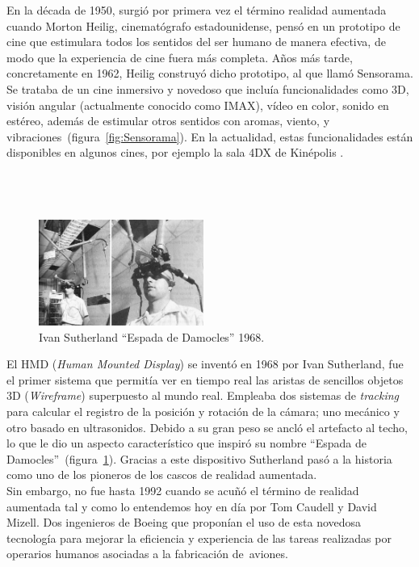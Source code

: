 En la década de 1950, surgió por primera vez el término realidad aumentada cuando Morton Heilig, cinematógrafo estadounidense, pensó en un prototipo de cine que estimulara todos los sentidos del ser humano de manera efectiva, de modo que la experiencia de cine fuera más completa. Años más tarde, concretamente en 1962, Heilig construyó dicho prototipo, al que llamó Sensorama. Se trataba de un cine inmersivo y novedoso que incluía funcionalidades como 3D, visión angular (actualmente conocido como IMAX), vídeo en color, sonido en estéreo, además de estimular otros sentidos con aromas, viento, y vibraciones~(figura~\ref{fig:Sensorama}). En la actualidad, estas funcionalidades están disponibles en algunos cines, por ejemplo la sala 4DX de Kinépolis \cite{kinepolis}.\\
\\
\\
\\


\begin{figure}
    \centering
    \includegraphics[width=0.48\textwidth]{Images/HumanMountDisplay.png}
    \caption{Ivan Sutherland ``Espada de Damocles'' 1968.}
    \label{fig:EspadaDamocles}
\end{figure}

 El HMD (\textit{Human Mounted Display}) se inventó en 1968 por Ivan Sutherland, fue el primer sistema que permitía ver en tiempo real las aristas de sencillos objetos 3D (\textit{Wireframe}) superpuesto al mundo real. Empleaba dos sistemas de \textit{tracking} para calcular el registro de la posición y rotación de la cámara; uno mecánico y otro basado en ultrasonidos. Debido a su gran peso se ancló el artefacto al techo, lo que le dio un aspecto característico que inspiró su nombre ``Espada de Damocles''~(figura~\ref{fig:EspadaDamocles}). Gracias a este dispositivo Sutherland pasó a la historia como uno de los pioneros de los cascos de realidad aumentada.\\

Sin embargo, no fue hasta 1992 cuando se acuñó el término de realidad aumentada tal y como lo entendemos hoy en día por Tom Caudell y David Mizell. Dos ingenieros de Boeing que proponían el uso de esta novedosa tecnología para mejorar la eficiencia y experiencia de las tareas realizadas por operarios humanos asociadas a la fabricación de~aviones.\\

